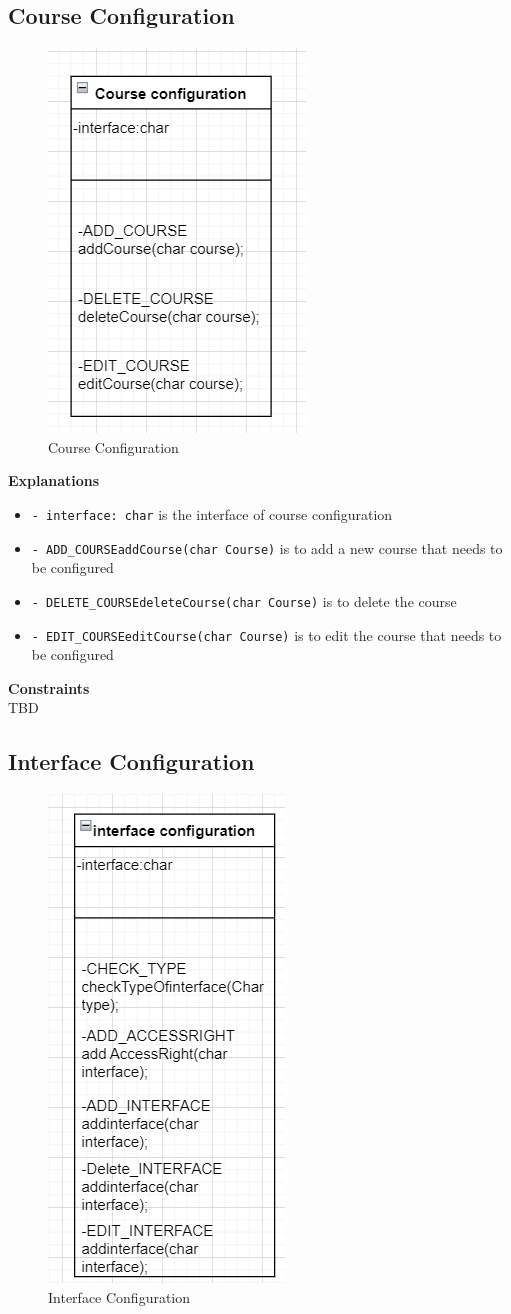 \subsection{Course Configuration}
\begin{figure}[H]
    \centering
    \includegraphics[width=0.3\linewidth]{picture/3-4/3-4-3.png}
    \caption{Course Configuration}
    \label{fig:enter-label}
\end{figure}

\textbf{Explanations}
\begin{itemize}
    \item \texttt{- interface: char} is the interface of course configuration
    \item \texttt{- ADD\_COURSEaddCourse(char Course)} is to add a new course that needs to be configured
    \item \texttt{- DELETE\_COURSEdeleteCourse(char Course)} is to delete the course
    \item \texttt{- EDIT\_COURSEeditCourse(char Course)} is to edit the course that needs to be configured
\end{itemize}

\textbf{Constraints} \\
TBD

\subsection{Interface Configuration}
\begin{figure}[H]
    \centering
    \includegraphics[width=0.3\linewidth]{picture/3-4/3-4-4.png}
    \caption{Interface Configuration}
    \label{fig:enter-label}
\end{figure}

